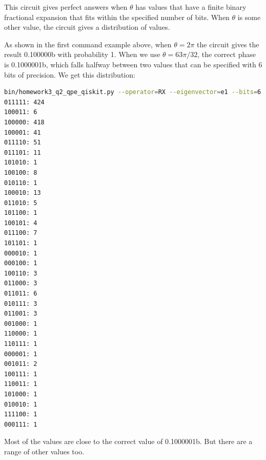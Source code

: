 \documentclass[12pt]{extarticle}
\begin{document}
This circuit gives perfect answers when $\theta$ has values that have a finite binary fractional expansion that fits within the specified number of bits.
When $\theta$ is some other value, the circuit gives a distribution of values.

As shown in the first command example above, when $\theta=2\pi$ the circuit gives the result 0.100000b with probability 1.
When we use $\theta=63\pi/32$, the correct phase is 0.1000001b, which falls halfway between two values that can be specified with 6 bits of precision.
We get this distribution:

\begin{lstlisting}[language=bash]
bin/homework3_q2_qpe_qiskit.py --operator=RX --eigenvector=e1 --bits=6 --theta="63*pi/32"
011111: 424
100011: 6
100000: 418
100001: 41
011110: 51
011101: 11
101010: 1
100100: 8
010110: 1
100010: 13
011010: 5
101100: 1
100101: 4
011100: 7
101101: 1
000010: 1
000100: 1
100110: 3
011000: 3
011011: 6
010111: 3
011001: 3
001000: 1
110000: 1
110111: 1
000001: 1
001011: 2
100111: 1
110011: 1
101000: 1
010010: 1
111100: 1
000111: 1
\end{lstlisting}

Most of the values are close to the correct value of 0.1000001b.
But there are a range of other values too.



\printbibliography
{}
\end{document}
